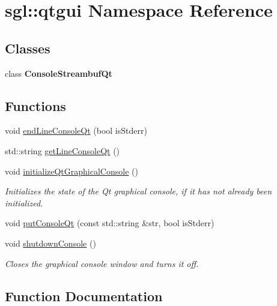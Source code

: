 \hypertarget{namespacesgl_1_1qtgui}{}\section{sgl\+:\+:qtgui Namespace Reference}
\label{namespacesgl_1_1qtgui}
\subsection*{Classes}
\begin{DoxyCompactItemize}
\item 
class {\bfseries Console\+Streambuf\+Qt}
\end{DoxyCompactItemize}
\subsection*{Functions}
\begin{DoxyCompactItemize}
\item 
void \mbox{\hyperlink{namespacesgl_1_1qtgui_aa860978c1abc72823f943acd03b2cb26}{end\+Line\+Console\+Qt}} (bool is\+Stderr)
\item 
std\+::string \mbox{\hyperlink{namespacesgl_1_1qtgui_ac9d3e41f643b89ff2ecbe0afc84072af}{get\+Line\+Console\+Qt}} ()
\item 
void \mbox{\hyperlink{namespacesgl_1_1qtgui_af114a24639056b7e4d4494427a9613f3}{initialize\+Qt\+Graphical\+Console}} ()
\begin{DoxyCompactList}\small\item\em Initializes the state of the Qt graphical console, if it has not already been initialized. \end{DoxyCompactList}\item 
void \mbox{\hyperlink{namespacesgl_1_1qtgui_a25ce060b47ba94ee61147714f19c1764}{put\+Console\+Qt}} (const std\+::string \&str, bool is\+Stderr)
\item 
void \mbox{\hyperlink{namespacesgl_1_1qtgui_a17eaeea713c89cc6d22caf36237b1955}{shutdown\+Console}} ()
\begin{DoxyCompactList}\small\item\em Closes the graphical console window and turns it off. \end{DoxyCompactList}\end{DoxyCompactItemize}


\subsection{Function Documentation}
\mbox{\label{namespacesgl_1_1qtgui_aa860978c1abc72823f943acd03b2cb26}} 
